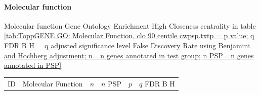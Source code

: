 \paragraph{Molecular function}

Molecular function Gene Ontology Enrichment High Closeness centrality in table \ref{tab:ToppGENE GO: Molecular Function. clo 90 centile cwpsp.txtp = p value; q FDR B H = q adjusted significance level False Discovery Rate using Benjamini and Hochberg adjustment; n= n genes annotated in test group; n PSP= n genes annotated in PSP}


  \begin{table}[ht]
\centering
\begin{adjustbox}{width=\textwidth}
\setlength{\extrarowheight}{2pt}
\begin{tabular}{@{}clllcl@{}}
  \toprule
  ID & Molecular Function & $n$ & $n$ PSP & $p$ & $q$ FDR B H \\ 


\end{tabular}
\end{adjustbox}
\end{table}
